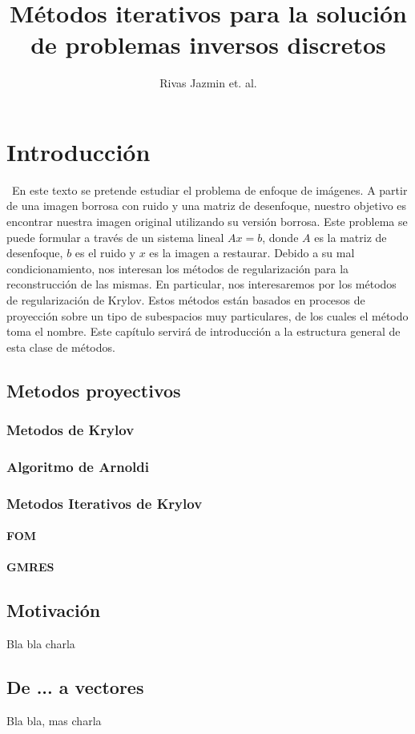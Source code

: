 \documentclass[12pt, oneside]{book}
\title{Métodos iterativos para la solución de problemas inversos discretos}
\author{Rivas Jazmin et. al.}
\date{}
\begin{document}
	\maketitle
	\tableofcontents
	
	
	\chapter{Introducción}
	\ En este texto se pretende estudiar el problema de enfoque de imágenes. A partir de una imagen borrosa con ruido y una matriz de desenfoque, nuestro objetivo es encontrar nuestra imagen original utilizando su versión borrosa. Este problema se puede formular a través de un sistema lineal $Ax = b$, donde $A$ es la matriz de desenfoque, $b$ es el ruido y $x$ es la imagen a restaurar. Debido a su mal condicionamiento, nos interesan los métodos de regularización para la reconstrucción de las mismas. En particular, nos interesaremos por los métodos de regularización de Krylov. Estos métodos están basados en procesos de proyección sobre un tipo de subespacios muy particulares, de los cuales el método toma el nombre. Este capítulo servirá de introducción a la estructura general de esta clase de métodos.
	
	
	\section{Metodos proyectivos}
	\subsection{Metodos de Krylov}
	\subsection{Algoritmo de Arnoldi}
	\subsection{Metodos Iterativos de Krylov}
	\subsubsection{FOM}
	\subsubsection{GMRES}
	\section{Motivación}
	Bla bla charla
	\section{De ... a vectores}
	Bla bla, mas charla
	
\end{document}
